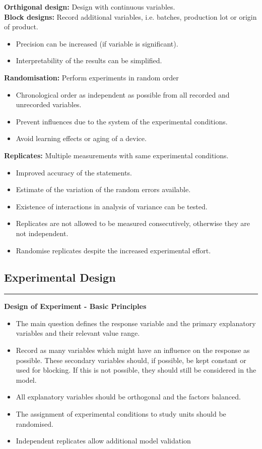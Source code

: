 \textbf{Orthigonal design:} Design with continuous variables.\\

\textbf{Block designs:} Record additional variables, i.e. batches, production lot or origin of product.
\begin{itemize}
  \item Precision can be increased (if variable is significant).
  \item Interpretability of the results can be simplified.
\end{itemize}

\textbf{Randomisation:} Perform experiments in random order
\begin{itemize}
  \item Chronological order as independent as possible from all recorded and unrecorded variables.
  \item Prevent influences due to the system of the experimental conditions.
  \item Avoid learning effects or aging of a device.
\end{itemize}

\textbf{Replicates:} Multiple measurements with same experimental conditions.
\begin{itemize}
  \item Improved accuracy of the statements.
  \item Estimate of the variation of the random errors available.
  \item Existence of interactions in analysis of variance can be tested.
  \item Replicates are not allowed to be measured consecutively, otherwise they are not independent.
  \item Randomise replicates despite the increased experimental effort.
\end{itemize}

\subsection{Experimental Design}
\noindent\rule[\linienAbstand]{\linewidth}{\linienDicke}
\textbf{Design of Experiment - Basic Principles}
\begin{itemize}
  \item The main question defines the response variable and the primary explanatory variables   and their relevant value range.
  \item Record as many variables which might have an influence on the response as possible.   These secondary variables should, if possible, be kept constant or used for blocking. If   this is not possible, they should still be considered in the model.
  \item All explanatory variables should be orthogonal and the factors balanced.
  \item The assignment of experimental conditions to study units should be randomised.
  \item Independent replicates allow additional model validation
\end{itemize}

